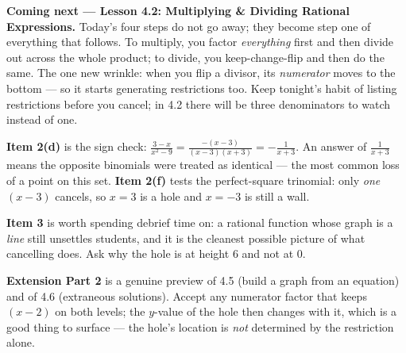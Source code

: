 \documentclass[10pt]{article}
\begin{document}
\begin{spiralbox}
\textbf{Coming next --- Lesson 4.2: Multiplying \& Dividing Rational Expressions.} Today's four steps
do not go away; they become step one of everything that follows. To multiply, you factor
\emph{everything} first and then divide out across the whole product; to divide, you keep-change-flip
and then do the same. The one new wrinkle: when you flip a divisor, its \emph{numerator} moves to the
bottom --- so it starts generating restrictions too. Keep tonight's habit of listing restrictions
before you cancel; in 4.2 there will be three denominators to watch instead of one.
\end{spiralbox}

\clearpage %
\begin{teachernote}
\textbf{Item 2(d)} is the sign check: $\frac{3-x}{x^2-9}=\frac{-(x-3)}{(x-3)(x+3)}=-\frac{1}{x+3}$.
An answer of $\frac{1}{x+3}$ means the opposite binomials were treated as identical --- the most common
loss of a point on this set. \textbf{Item 2(f)} tests the perfect-square trinomial: only \emph{one}
$(x-3)$ cancels, so $x=3$ is a hole and $x=-3$ is still a wall.

\vspace{3pt}
\textbf{Item 3} is worth spending debrief time on: a rational function whose graph is a
\emph{line} still unsettles students, and it is the cleanest possible picture of what cancelling does.
Ask why the hole is at height $6$ and not at $0$.

\vspace{3pt}
\textbf{Extension Part 2} is a genuine preview of 4.5 (build a graph from an equation) and of 4.6
(extraneous solutions). Accept any numerator factor that keeps $(x-2)$ on both levels; the $y$-value of
the hole then changes with it, which is a good thing to surface --- the hole's location is
\emph{not} determined by the restriction alone.
\end{teachernote}
\end{document}
